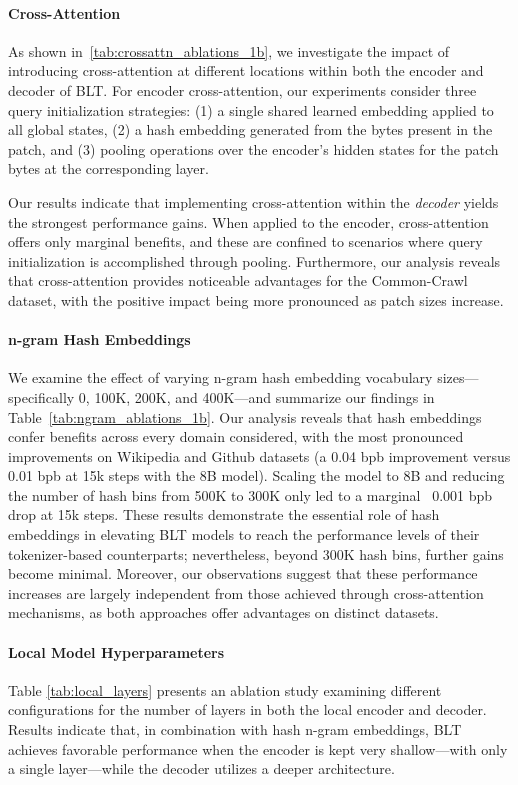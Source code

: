 \paragraph{Cross-Attention}
As shown in~\autoref{tab:crossattn_ablations_1b}, we investigate the impact of introducing cross-attention at different locations within both the encoder and decoder of {\textsc BLT}. For encoder cross-attention, our experiments consider three query initialization strategies: (1) a single shared learned embedding applied to all global states, (2) a hash embedding generated from the bytes present in the patch, and (3) pooling operations over the encoder’s hidden states for the patch bytes at the corresponding layer.

Our results indicate that implementing cross-attention within the \textit{decoder} yields the strongest performance gains. When applied to the encoder, cross-attention offers only marginal benefits, and these are confined to scenarios where query initialization is accomplished through pooling. Furthermore, our analysis reveals that cross-attention provides noticeable advantages for the Common-Crawl dataset, with the positive impact being more pronounced as patch sizes increase.

\paragraph{n-gram Hash Embeddings} 

We examine the effect of varying n-gram hash embedding vocabulary sizes—specifically 0, 100K, 200K, and 400K—and summarize our findings in Table~\ref{tab:ngram_ablations_1b}. Our analysis reveals that hash embeddings confer benefits across every domain considered, with the most pronounced improvements on Wikipedia and Github datasets (a 0.04 bpb improvement versus 0.01 bpb at 15k steps with the 8B model). Scaling the model to 8B and reducing the number of hash bins from 500K to 300K only led to a marginal ~0.001 bpb drop at 15k steps. These results demonstrate the essential role of hash embeddings in elevating {\textsc BLT} models to reach the performance levels of their tokenizer-based counterparts; nevertheless, beyond 300K hash bins, further gains become minimal. Moreover, our observations suggest that these performance increases are largely independent from those achieved through cross-attention mechanisms, as both approaches offer advantages on distinct datasets.

\paragraph{Local Model Hyperparameters} Table \ref{tab:local_layers} presents an ablation study examining different configurations for the number of layers in both the local encoder and decoder. Results indicate that, in combination with hash n-gram embeddings, {\textsc BLT} achieves favorable performance when the encoder is kept very shallow—with only a single layer—while the decoder utilizes a deeper architecture.

